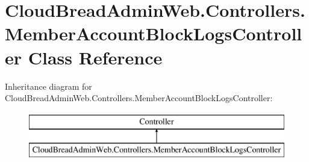 \hypertarget{a00136}{}\section{Cloud\+Bread\+Admin\+Web.\+Controllers.\+Member\+Account\+Block\+Logs\+Controller Class Reference}
\label{a00136}
Inheritance diagram for Cloud\+Bread\+Admin\+Web.\+Controllers.\+Member\+Account\+Block\+Logs\+Controller\+:\begin{figure}[H]
\begin{center}
\leavevmode
\includegraphics[height=2.000000cm]{a00136}
\end{center}
\end{figure}
